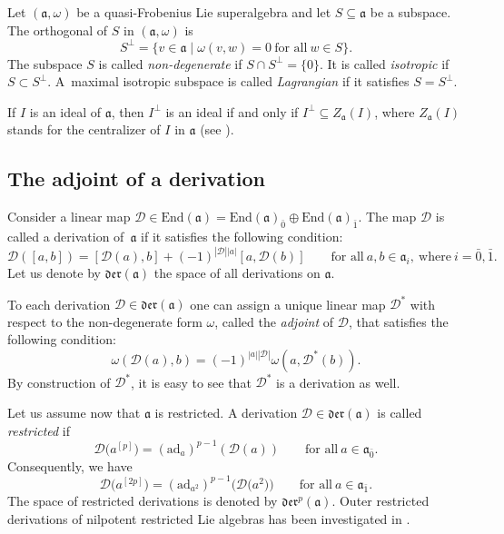 \documentclass[pdftex]{sigma}
\numberwithin{equation}{section}
\begin{document}
Let $(\mathfrak{a}, \omega)$ be a quasi-Frobenius Lie superalgebra and let $S \subseteq \mathfrak{a}$ be a subspace. The orthogonal of $S$ in $(\mathfrak{a}, \omega)$ is
\[
S^\perp = \{v \in \mathfrak{a}\mid \omega(v,w) = 0\ \text{for all} \ w \in S\}.
\]
The subspace $S$ is called {\it non-degenerate} if $S \cap S^\perp = \{0\}$. It is called
{\it isotropic} if ${S \subset S^\perp}$. A~maximal isotropic subspace is called {\it Lagrangian} if it satisfies $S = S^\perp$.

If $I$ is an ideal of $\mathfrak{a}$, then $I^\perp$ is an ideal if and only if $I^\perp \subseteq Z_\mathfrak{a}(I)$, where $Z_\mathfrak{a}(I)$ stands for
the centralizer of $I$ in $\mathfrak{a}$ (see \cite[Lemma~2.4]{BM}).

\subsection{The adjoint of a derivation}
Consider a linear map ${\mathscr D}\in \mathrm{End}(\mathfrak{a})=\mathrm{End}(\mathfrak{a})_{\bar 0}\oplus \mathrm{End}(\mathfrak{a})_{\bar 1} $. The map ${\mathscr D}$ is called a derivation of~$\mathfrak{a}$ if it satisfies the following condition:
\[
{\mathscr D}([a,b])=[ {\mathscr D}(a),b] +(-1)^{|{\mathscr D}||a|} [a, {\mathscr D} (b)]\qquad \text{for all}\ a, b\in \mathfrak{a}_i,\ \text{where}\ i=\bar 0, \bar 1.
\]
Let us denote by $\mathfrak{der}(\mathfrak{a})$ the space of all derivations on $\mathfrak{a}$.

To each derivation ${\mathscr D}\in \mathfrak{der}(\mathfrak{a})$ one can assign a unique linear map ${\mathscr D}^*$ with respect to the non-degenerate form $\omega$, called the {\it adjoint} of ${\mathscr D}$, that satisfies the following condition:
\[
\omega({\mathscr D}(a),b) = (-1)^{|a| |{\mathscr D}|} \omega(a, {\mathscr D}^*(b)).
\]
By construction of ${\mathscr D}^*$, it is easy to see that ${\mathscr D}^*$ is a derivation as well.

Let us assume now that $\mathfrak{a}$ is restricted. A derivation $\mathscr{D}\in \mathfrak{der}(\mathfrak{a})$ is called \textit{restricted} if
\[
\mathscr{D}\bigl(a^{[p]}\bigr)=(\mathrm{ad}_a)^{p-1} (\mathscr{D}(a)) \qquad \text{for all} \ a\in \mathfrak{a}_{\bar 0}.
\]
Consequently, we have
\[
\mathscr{D}\bigl(a^{[2p]}\bigr)=(\mathrm{ad}_{a^2})^{p-1} \bigl(\mathscr{D}\big(a^2\big)\bigr) \qquad \text{for all} \ a\in \mathfrak{a}_{\bar 1}.
\]
The space of restricted derivations is denoted by $\mathfrak{der}^p(\mathfrak{a})$. Outer restricted derivations of nilpotent restricted Lie algebras has been investigated in \cite{FSW}.
\end{document}
